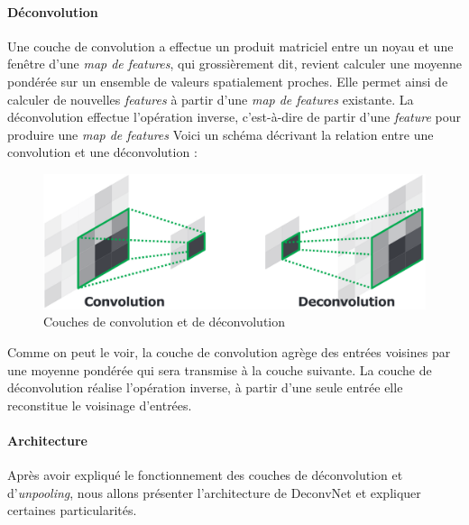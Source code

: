 \documentclass[a4paper, 11pt]{report}
\begin{document}
\paragraph{Déconvolution}
Une couche de convolution a effectue un produit matriciel entre un noyau et une fenêtre d'une \emph{map de  features}, qui grossièrement dit, revient calculer une moyenne pondérée sur un ensemble de valeurs spatialement proches.
Elle permet ainsi de calculer de nouvelles \emph{features} à partir d'une \emph{map de features} existante.
La déconvolution effectue l'opération inverse, c'est-à-dire de partir d'une \emph{feature} pour produire une \emph{map de features}
Voici un schéma décrivant la relation entre une convolution et une déconvolution :
\begin{figure}[H]
	\begin{center}
		\includegraphics[scale=0.3]{Images/Deconvolution.png}
		\caption{Couches de convolution et de déconvolution}
	\end{center}
\end{figure}
Comme on peut le voir, la couche de convolution agrège des entrées voisines par une moyenne pondérée qui sera transmise à la couche suivante.
La couche de déconvolution réalise l'opération inverse, à partir d'une seule entrée elle reconstitue le voisinage d'entrées.

\paragraph{Architecture}
Après avoir expliqué le fonctionnement des couches de déconvolution et d'\emph{unpooling}, nous allons présenter l'architecture de DeconvNet et expliquer certaines particularités.
\end{document}
